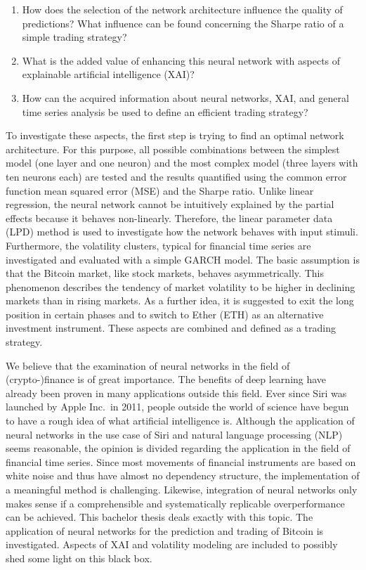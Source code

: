 \documentclass[
]{article}
\begin{document}
\begin{enumerate}
\def\labelenumi{\arabic{enumi})}
\item
  How does the selection of the network architecture influence the
  quality of predictions? What influence can be found concerning the
  Sharpe ratio of a simple trading strategy?
\item
  What is the added value of enhancing this neural network with aspects
  of explainable artificial intelligence (XAI)?
\item
  How can the acquired information about neural networks, XAI, and
  general time series analysis be used to define an efficient trading
  strategy?
\end{enumerate}

To investigate these aspects, the first step is trying to find an
optimal network architecture. For this purpose, all possible
combinations between the simplest model (one layer and one neuron) and
the most complex model (three layers with ten neurons each) are tested
and the results quantified using the common error function mean squared
error (MSE) and the Sharpe ratio. Unlike linear regression, the neural
network cannot be intuitively explained by the partial effects because
it behaves non-linearly. Therefore, the linear parameter data (LPD)
method is used to investigate how the network behaves with input
stimuli. Furthermore, the volatility clusters, typical for financial
time series are investigated and evaluated with a simple GARCH model.
The basic assumption is that the Bitcoin market, like stock markets,
behaves asymmetrically. This phenomenon describes the tendency of market
volatility to be higher in declining markets than in rising markets. As
a further idea, it is suggested to exit the long position in certain
phases and to switch to Ether (ETH) as an alternative investment
instrument. These aspects are combined and defined as a trading
strategy.

We believe that the examination of neural networks in the field of
(crypto-)finance is of great importance. The benefits of deep learning
have already been proven in many applications outside this field. Ever
since Siri was launched by Apple Inc.~in 2011, people outside the world
of science have begun to have a rough idea of what artificial
intelligence is. Although the application of neural networks in the use
case of Siri and natural language processing (NLP) seems reasonable, the
opinion is divided regarding the application in the field of financial
time series. Since most movements of financial instruments are based on
white noise and thus have almost no dependency structure, the
implementation of a meaningful method is challenging. Likewise,
integration of neural networks only makes sense if a comprehensible and
systematically replicable overperformance can be achieved. This bachelor
thesis deals exactly with this topic. The application of neural networks
for the prediction and trading of Bitcoin is investigated. Aspects of
XAI and volatility modeling are included to possibly shed some light on
this black box.
\end{document}
